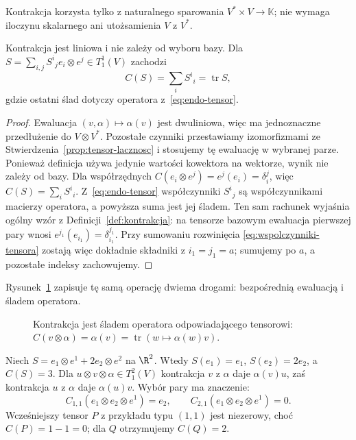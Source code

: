 Kontrakcja korzysta tylko z naturalnego sparowania
$V^*\times V\to\mathbb K$; nie wymaga iloczynu skalarnego
ani utożsamienia $V$ z $V^*$.

\begin{stwierdzenie}
\label{prop:kontrakcja-slad}
Kontrakcja jest liniowa i nie zależy od wyboru bazy. Dla
$S=\sum_{i,j}S^i{}_j e_i\otimes e^j\in T^1_1(V)$ zachodzi
\[
 C(S)=\sum_i S^i{}_i=\operatorname{tr}S,
\]
gdzie ostatni ślad dotyczy operatora z~\eqref{eq:endo-tensor}.
\end{stwierdzenie}
\begin{proof}
Ewaluacja $(v,\alpha)\mapsto\alpha(v)$ jest dwuliniowa,
więc ma jednoznaczne przedłużenie do $V\otimes V^*$.
Pozostałe czynniki przestawiamy izomorfizmami ze
Stwierdzenia~\ref{prop:tensor-lacznosc} i stosujemy tę ewaluację
w wybranej parze. Ponieważ definicja używa jedynie wartości
kowektora na wektorze, wynik nie zależy od bazy.
Dla współrzędnych $C(e_i\otimes e^j)=e^j(e_i)=\delta_i^j$,
więc $C(S)=\sum_i S^i{}_i$. Z~\eqref{eq:endo-tensor}
współczynniki $S^i{}_j$ są współczynnikami macierzy operatora,
a powyższa suma jest jej śladem.
Ten sam rachunek wyjaśnia ogólny wzór z
Definicji~\ref{def:kontrakcja}: na tensorze bazowym
ewaluacja pierwszej pary wnosi
$e^{j_1}(e_{i_1})=\delta^{j_1}_{i_1}$.
Przy sumowaniu rozwinięcia \eqref{eq:wspolczynniki-tensora}
zostają więc dokładnie składniki z $i_1=j_1=a$;
sumujemy po $a$, a pozostałe indeksy zachowujemy.
\end{proof}

Rysunek~\ref{fig:kontrakcja-slad} zapisuje tę samą operację
dwiema drogami: bezpośrednią ewaluacją i śladem operatora.
\begin{figure}[H]
\centering
{}
\caption{Kontrakcja jest śladem operatora odpowiadającego tensorowi:
$C(v\otimes\alpha)=\alpha(v)=\operatorname{tr}(w\mapsto\alpha(w)v)$.}
\label{fig:kontrakcja-slad}
\end{figure}

\begin{przyklad}
Niech $S=e_1\otimes e^1+2e_2\otimes e^2$ na $\R^2$.
Wtedy $S(e_1)=e_1$, $S(e_2)=2e_2$, a $C(S)=3$.
Dla $u\otimes v\otimes\alpha\in T^2_1(V)$ kontrakcja
$v$ z $\alpha$ daje $\alpha(v)u$, zaś kontrakcja
$u$ z $\alpha$ daje $\alpha(u)v$. Wybór pary ma znaczenie:
\[
 C_{1,1}(e_1\otimes e_2\otimes e^1)=e_2,
 \qquad C_{2,1}(e_1\otimes e_2\otimes e^1)=0.
\]
Wcześniejszy tensor $P$ z przykładu typu $(1,1)$ jest niezerowy,
choć $C(P)=1-1=0$; dla $Q$ otrzymujemy $C(Q)=2$.
\end{przyklad}

